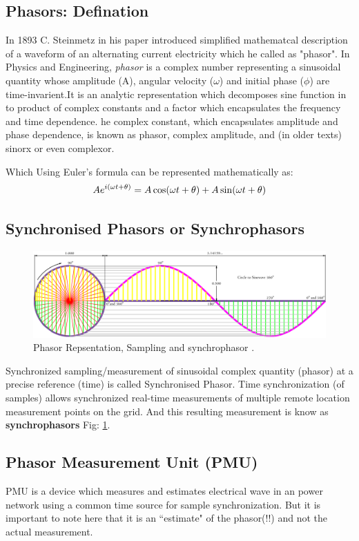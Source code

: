 \subsection{Phasors: Defination}

In 1893 C. Steinmetz in his paper introduced simplified mathematcal description of a waveform of an alternating current electricity which he called as "phasor". In Physics and Engineering, \textit{phasor} is a complex number representing a sinusoidal quantity whose amplitude (A), angular velocity ($\omega$) and initial phase ($\phi$) are time-invarient.It is an analytic representation which decomposes sine function in to product of complex constants and a factor which encapsulates the frequency and time dependence. he complex constant, which encapsulates amplitude and phase dependence, is known as phasor, complex amplitude, and (in older texts) sinorx or even complexor.

Which Using Euler's formula can be represented mathematically as:
\begin{equation}\boldmath
Ae^{i(\omega t + \theta)} = A\cos(\omega t + \theta) + A\sin(\omega t + \theta)
\end{equation}

\subsection{Synchronised Phasors or Synchrophasors}
\begin{figure}
	\includegraphics[width=\textwidth]{fig/Circle-To-Sine-Wave.png}
	\caption{Phasor Repsentation, Sampling and synchrophasor \cite{CirSinWave} .} 
	\label{fig:CirSin}
\end{figure}
 Synchronized sampling/measurement of sinusoidal complex quantity (phasor) at a precise reference (time) is called Synchronised Phasor. Time synchronization (of samples) allows synchronized real-time measurements of multiple remote location measurement points on the grid. And this resulting measurement is know as \textbf{synchrophasors} Fig: \ref{fig:CirSin}.
\subsection{Phasor Measurement Unit (PMU)}
PMU is a device which measures and estimates electrical wave in an power network using a common time source for sample synchronization. But it is important to note here that it is an ``estimate" of the phasor(!!) and not the actual measurement. 

